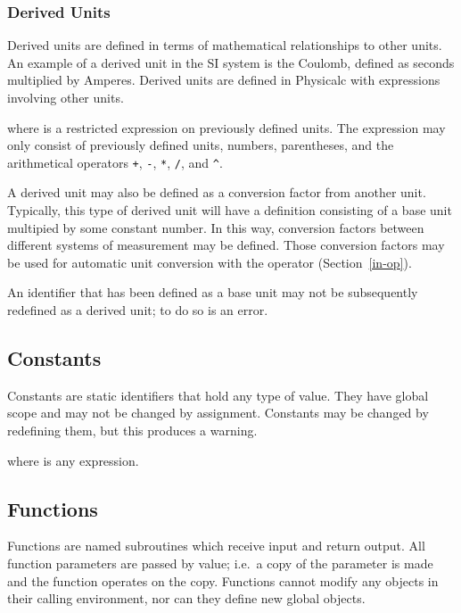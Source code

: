 \subsubsection{Derived Units}

Derived units are defined in terms of mathematical relationships to
other units.  An example of a derived unit in the SI system is the
Coulomb, defined as seconds multiplied by Amperes.\cite{derived-unit}
Derived units are defined in Physicalc with expressions involving
other units.

\begin{syntax}
 \id{} \key{=} \expr{} 
\end{syntax}
where \expr{} is a restricted expression on previously defined units.
The expression may only consist of previously defined units, numbers,
parentheses, and the arithmetical operators \verb|+|, \verb|-|,
\verb|*|, \verb|/|, and \verb|^|.

A derived unit may also be defined as a conversion factor from another
unit.  Typically, this type of derived unit will have a definition
\expr{} consisting of a base unit multipied by some constant number.
In this way, conversion factors between different systems of
measurement may be defined.  Those conversion factors may be used for
automatic unit conversion with the  operator
(Section~\ref{in-op}).

An identifier that has been defined as a base unit may not be
subsequently redefined as a derived unit; to do so is an error.



\subsection{Constants}
\label{constants}

Constants are static identifiers that hold any type of value.  They
have global scope and may not be changed by assignment.  Constants may
be changed by redefining them, but this produces a warning.

\begin{syntax}
 \id{} \key{=} \expr{}
\end{syntax}
where \expr{} is any expression.


\subsection{Functions}
\label{functions}

Functions are named subroutines which receive input and return output.
All function parameters are passed by value; i.e.\ a copy of the
parameter is made and the function operates on the copy.  Functions
cannot modify any objects in their calling environment, nor can they
define new global objects.

